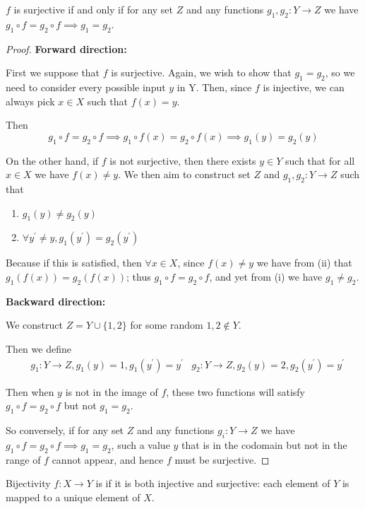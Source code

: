 \begin{proposition}
$f$ is surjective if and only if for any set $Z$ and any functions $g_1,g_2:Y\to Z$ we have $g_1 \circ f=g_2 \circ f \implies g_1=g_2$.
\end{proposition}
\begin{proof}
\textbf{Forward direction:}

First we suppose that $f$ is surjective. Again, we wish to show that $g_1=g_2$, so we need to consider every possible input $y$ in Y. Then, since $f$ is injective, we can always pick $x \in X$ such that $f(x)=y$.

Then
\[ g_1 \circ f=g_2 \circ f \implies g_1 \circ f(x)=g_2 \circ f(x) \implies g_1(y)=g_2(y) \]

On the other hand, if $f$ is not surjective, then there exists $y \in Y$ such that for all $x \in X$ we have $f(x)\neq y$. We then aim to construct set $Z$ and $g_1,g_2:Y\to Z$ such that
\begin{enumerate}[label=(\roman*)]
\item $g_1(y) \neq g_2(y)$
\item $\forall y^\prime \neq y, g_1(y^\prime)=g_2(y^\prime)$
\end{enumerate}

Because if this is satisfied, then $\forall x \in X$, since $f(x)\neq y$ we have from (ii) that $g_1(f(x))=g_2(f(x))$; thus $g_1 \circ f=g_2 \circ f$, and yet from (i) we have $g_1 \neq g_2$.

\textbf{Backward direction:}

We construct $Z=Y\cup\{1,2\}$ for some random $1,2 \notin Y$.

Then we define
\begin{align*}
&g_1:Y\to Z,g_1(y)=1,g_1(y^\prime)=y^\prime
&g_2:Y\to Z,g_2(y)=2,g_2(y^\prime)=y^\prime
\end{align*}

Then when $y$ is not in the image of $f$, these two functions will satisfy $g_1 \circ f=g_2 \circ f$ but not $g_1=g_2$.

So conversely, if for any set $Z$ and any functions $g_i:Y \to Z$ we have $g_1 \circ f=g_2 \circ f \implies g_1=g_2$, such a value $y$ that is in the codomain but not in the range of $f$ cannot appear, and hence $f$ must be surjective.
\end{proof}

\begin{defn}{Bijectivity}{}
$f:X\to Y$ is  if it is both injective and surjective: each element of $Y$ is mapped to a unique element of $X$.
\end{defn}
\pagebreak

